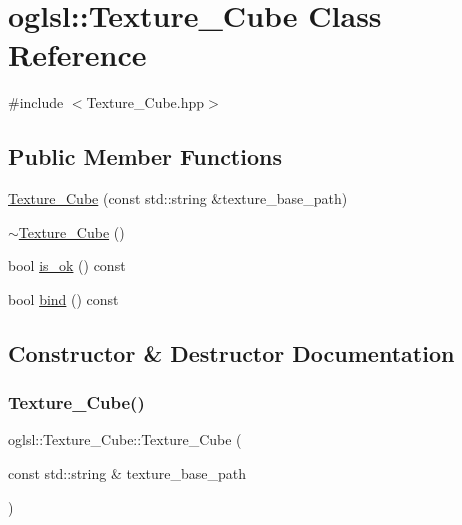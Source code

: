 \hypertarget{classoglsl_1_1_texture___cube}{}\section{oglsl\+:\+:Texture\+\_\+\+Cube Class Reference}
\label{classoglsl_1_1_texture___cube}


{\ttfamily \#include $<$Texture\+\_\+\+Cube.\+hpp$>$}

\subsection*{Public Member Functions}
\begin{DoxyCompactItemize}
\item 
\mbox{\hyperlink{classoglsl_1_1_texture___cube_a602b47e0995d1bbaff2366a0404f2278}{Texture\+\_\+\+Cube}} (const std\+::string \&texture\+\_\+base\+\_\+path)
\item 
\mbox{\hyperlink{classoglsl_1_1_texture___cube_abb90a046f71c9ff38cf6ddaf527fc080}{$\sim$\+Texture\+\_\+\+Cube}} ()
\item 
bool \mbox{\hyperlink{classoglsl_1_1_texture___cube_ae969ccb44e3d5ccf5afc408fa0c3f150}{is\+\_\+ok}} () const
\item 
bool \mbox{\hyperlink{classoglsl_1_1_texture___cube_ad8552ff114dbbd3b3e8041c2327f00e6}{bind}} () const
\end{DoxyCompactItemize}


\subsection{Constructor \& Destructor Documentation}
\mbox{\label{classoglsl_1_1_texture___cube_a602b47e0995d1bbaff2366a0404f2278}} 
\subsubsection{\texorpdfstring{Texture\+\_\+\+Cube()}{Texture\_Cube()}}
{\footnotesize\ttfamily oglsl\+::\+Texture\+\_\+\+Cube\+::\+Texture\+\_\+\+Cube (\begin{DoxyParamCaption}\item[{const std\+::string \&}]{texture\+\_\+base\+\_\+path }\end{DoxyParamCaption})}

